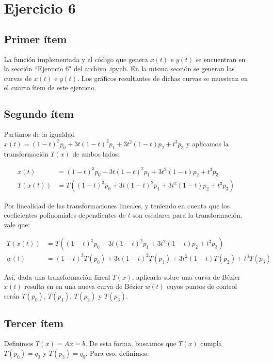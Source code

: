\documentclass{article}
\begin{document}
\section*{Ejercicio 6}
\subsection*{Primer ítem}
La función implementada y el código que genera $x(t)$ e $y(t)$ se encuentran en la sección ``Ejercicio 6" del archivo .ipynb. En la misma sección se generan las curvas de $x(t)$ e $y(t)$. Los gráficos resultantes de dichas curvas se muestran en el cuarto ítem de este ejercicio.

\subsection*{Segundo ítem}
Partimos de la igualdad $x(t) = (1 - t)^3 p_0 + 3t(1 - t)^2 p_1 + 3t^2(1 - t) p_2 + t^3 p_3$ y aplicamos la transformación $T(x)$ de ambos lados:

$$
\begin{aligned}
x(t) &= (1 - t)^3 p_0 + 3t(1 - t)^2 p_1 + 3t^2(1 - t) p_2 + t^3 p_3 \\
T(x(t)) &= T((1 - t)^3 p_0 + 3t(1 - t)^2 p_1 + 3t^2(1 - t) p_2 + t^3 p_3)
\end{aligned}
$$

Por linealidad de las transformaciones lineales, y teniendo en cuenta que los coeficientes polinomiales dependientes de $t$ son escalares para la transformación, vale que:

$$
\begin{aligned}
T(x(t)) &= T((1 - t)^3 p_0 + 3t(1 - t)^2 p_1 + 3t^2(1 - t) p_2 + t^3 p_3) \\
w(t) &= (1 - t)^3 T(p_0) + 3t(1 - t)^2 T(p_1) + 3t^2(1 - t) T(p_2) + t^3 T(p_3)
\end{aligned}
$$

Así, dada una transformación lineal $T(x)$, aplicarla sobre una curva de Bézier $x(t)$ resulta en en una nueva curva de Bézier $w(t)$ cuyos puntos de control serán  $T(p_0)$,  $T(p_1)$,  $T(p_2)$ y  $T(p_3)$.

\subsection*{Tercer ítem}
Definimos $T(x) = Ax = b$. De esta forma, buscamos que $T(x)$ cumpla $T(p_0) = q_3$ y $T(p_3) = q_0$. 
Para eso, definimos: 
\end{document}
